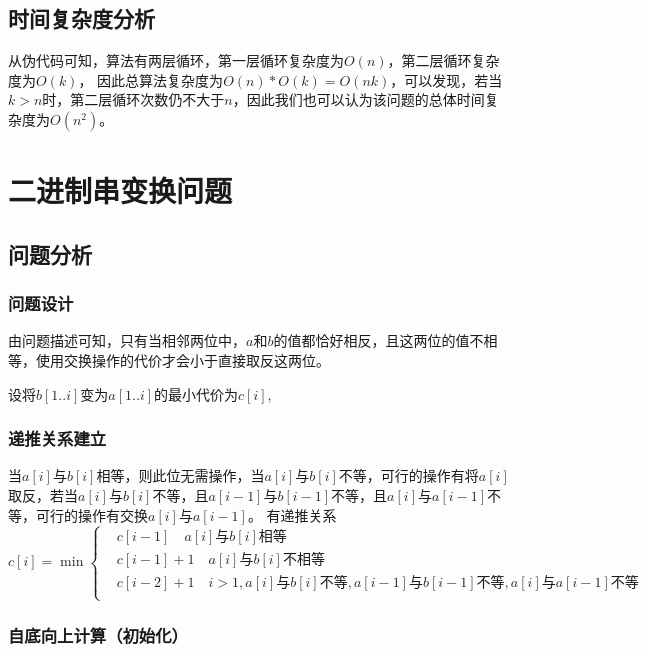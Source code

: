 \subsection{时间复杂度分析}

从伪代码可知，算法有两层循环，第一层循环复杂度为$O(n)$，第二层循环复杂度为$O(k)$， 因此总算法复杂度为$O(n) * O(k) = O(nk)$，可以发现，若当$k>n$时，第二层循环次数仍不大于$n$，因此我们也可以认为该问题的总体时间复杂度为$O(n^2)$。

\section{二进制串变换问题}

\subsection{问题分析}
\subsubsection{问题设计}
由问题描述可知，只有当相邻两位中，$a$和$b$的值都恰好相反，且这两位的值不相等，使用交换操作的代价才会小于直接取反这两位。

设将$b[1..i]$变为$a[1..i]$的最小代价为$c[i]$,
\subsubsection{递推关系建立}
当$a[i]$与$b[i]$相等，则此位无需操作，当$a[i]$与$b[i]$不等，可行的操作有将$a[i]$取反，若当$a[i]$与$b[i]$不等，且$a[i-1]$与$b[i-1]$不等，且$a[i]$与$a[i-1]$不等，可行的操作有交换$a[i]$与$a[i-1]$。
有递推关系
\begin{equation}
    c[i]= \min
    \left \{
    \begin{aligned}
        &c[i-1] \quad a[i]\text{与}b[i]\text{相等} \\
        &c[i-1]+1 \quad a[i]\text{与}b[i]\text{不相等} \\
        &c[i-2]+1 \quad i>1, a[i]\text{与}b[i]\text{不等},a[i-1]\text{与}b[i-1]\text{不等},a[i]\text{与}a[i-1]\text{不等}\\
    \end{aligned}
    \right .
\end{equation}

\subsubsection{自底向上计算（初始化）}


